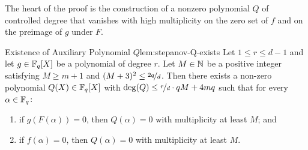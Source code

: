 The heart of the proof is the construction of a nonzero polynomial $Q$ of controlled degree that vanishes with high multiplicity on the zero set of $f$ and on the preimage of $g$ under $F$.
\begin{lemma}{Existence of Auxiliary Polynomial $Q$}{lem:stepanov-Q-exists}
  Let $1\leq r\leq d-1$ and let $g\in\mathbb{F}_q[X]$ be a polynomial of degree $r$. Let $M\in\mathbb{N}$ be a positive integer satisfying $M\geq m+1$ and $(M+3)^2\leq \nicefrac{2q}{d}$. Then there exists a non-zero polynomial $Q(X)\in\mathbb{F}_q[X]$ with $\deg(Q)\leq \nicefrac{r}{d}\cdot qM+4mq$ such that for every $\alpha\in\mathbb{F}_q$:
  \begin{enumerate}[label=(\roman*)]
    \item if $g(F(\alpha))=0$, then $Q(\alpha)=0$ with multiplicity at least $M$; and
    \item if $f(\alpha)=0$, then $Q(\alpha)=0$ with multiplicity at least $M$.
  \end{enumerate}
\end{lemma}
